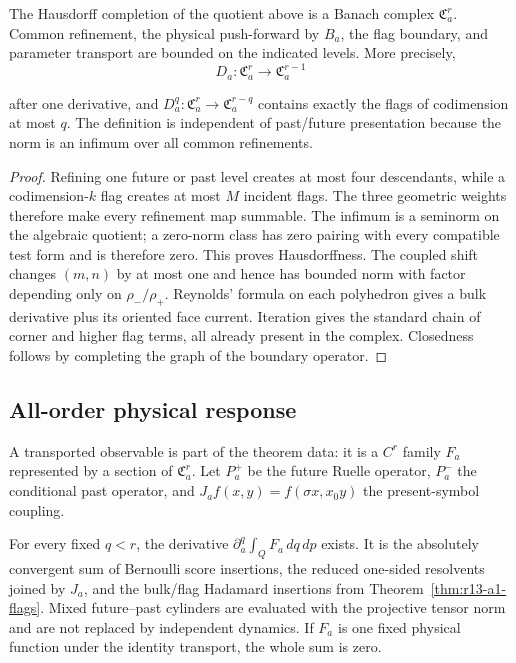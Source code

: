 \begin{theorem}
\label{thm:r13-a1-flags}
The Hausdorff completion of the quotient above is a Banach complex
$\mathfrak C_a^r$.  Common refinement, the physical push-forward by $B_a$,
the flag boundary, and parameter transport are bounded on the indicated
levels.  More precisely,
\[
 D_a:\mathfrak C_a^r\longrightarrow\mathfrak C_a^{r-1}
\]

after one derivative, and
$D_a^q:\mathfrak C_a^r\to\mathfrak C_a^{r-q}$ contains exactly the flags of
codimension at most $q$.  The definition is independent of past/future
presentation because the norm is an infimum over all common refinements.
\end{theorem}

\begin{proof}
Refining one future or past level creates at most four descendants, while a
codimension-$k$ flag creates at most $M$ incident flags.  The three geometric
weights therefore make every refinement map summable.  The infimum is a
seminorm on the algebraic quotient; a zero-norm class has zero pairing with
every compatible test form and is therefore zero.  This proves Hausdorffness.
The coupled shift changes $(m,n)$ by at most one and hence has bounded norm
with factor depending only on $\rho_-/\rho_+$.  Reynolds' formula on each
polyhedron gives a bulk derivative plus its oriented face current.  Iteration
gives the standard chain of corner and higher flag terms, all already present
in the complex.  Closedness follows by completing the graph of the boundary
operator.
\end{proof}

\subsection{All-order physical response}

A transported observable is part of the theorem data: it is a $C^r$ family
$F_a$ represented by a section of $\mathfrak C_a^r$.  Let $P_a^+$ be the
future Ruelle operator, $P_a^-$ the conditional past operator, and
$J_af(x,y)=f(\sigma x,x_0y)$ the present-symbol coupling.

\begin{theorem}
\label{thm:r13-a1-response}
For every fixed $q<r$, the derivative
$\partial_a^q\int_QF_a\,dq\,dp$ exists.  It is the absolutely convergent sum
of Bernoulli score insertions, the reduced one-sided resolvents joined by
$J_a$, and the bulk/flag Hadamard insertions from
Theorem~\ref{thm:r13-a1-flags}.  Mixed future--past cylinders are evaluated
with the projective tensor norm and are not replaced by independent dynamics.
If $F_a$ is one fixed physical function under the identity transport, the
whole sum is zero.
\end{theorem}

